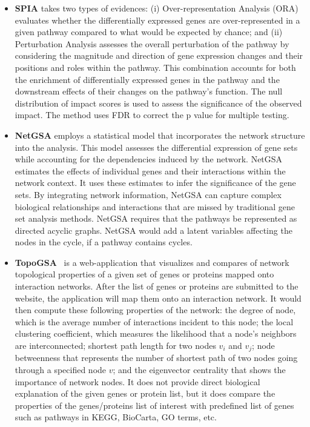 \documentclass[Minh_PhD_thesis.tex]{subfiles}
\begin{document}
\begin{itemize}
\item \textbf{SPIA} \cite{tarca2009novel} takes two types of evidences: (i) Over-representation Analysis (ORA) evaluates whether the differentially expressed genes are over-represented in a given pathway compared to what would be expected by chance; and (ii) Perturbation Analysis assesses the overall perturbation of the pathway by considering the magnitude and direction of gene expression changes and their positions and roles within the pathway. This combination accounts for both the enrichment of differentially expressed genes in the pathway and the downstream effects of their changes on the pathway’s function. The null distribution of impact scores is used to assess the significance of the observed impact. The method uses FDR to correct the p value for multiple testing.

\item \textbf{NetGSA} \cite{Shojaie:2009} employs a statistical model that incorporates the network structure into the analysis. This model assesses the differential expression of gene sets while accounting for the dependencies induced by the network. NetGSA estimates the effects of individual genes and their interactions within the network context. It uses these estimates to infer the significance of the gene sets. By integrating network information, NetGSA can capture complex biological relationships and interactions that are missed by traditional gene set analysis methods. 
NetGSA requires that the pathways be represented as directed acyclic graphs. NetGSA would add a  latent variables affecting the nodes in the cycle, if a pathway contains cycles.

\item \textbf{TopoGSA}~\cite{Glaab:2010a} is a web-application that visualizes and compares of network topological properties of a given set of genes or proteins mapped onto interaction networks. After the list of genes or proteins are submitted to the website, the application will map them onto an interaction network. It would then compute these following properties of the network: the degree of node, which is the average number of interactions incident to this node; the local clustering coefficient, which measures the likelihood that a node's neighbors are interconnected; shortest path length for two nodes $v_i$ and $v_j$; node betweenness that represents the number of shortest path of two nodes going through a specified node $v$; and the eigenvector centrality that shows the importance of network nodes. It does not provide direct biological explanation of the given genes or protein list, but it does compare the properties of the genes/proteins list of interest with predefined list of genes such as pathways in KEGG, BioCarta, GO terms, etc.


\end{itemize}
\end{document}
